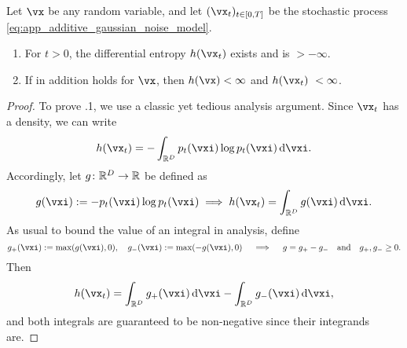 \documentclass[../../book-main.tex]{subfiles}
\begin{document}
\begin{lemma}\label{lem:diffusion_entropy_exists}
    Let \(\vx\) be any random variable, and let \((\vx_{t})_{t \in [0, T]}\) be the stochastic process \eqref{eq:app_additive_gaussian_noise_model}. 
    \begin{enumerate}
        \item For \(t > 0\), the differential entropy \(h(\vx_{t})\) exists and is \(> -\infty\).
        \item If in addition  holds for \(\vx\), then \(h(\vx) < \infty\) and \(h(\vx_{t})\ < \infty\).
    \end{enumerate}
\end{lemma}
\begin{proof}
    To prove .1, we use a classic yet tedious analysis argument. Since \(\vx_{t}\) has a density, we can write 
    \begin{equation}
        h(\vx_{t}) = -\int_{\R^{D}}p_{t}(\vxi)\log p_{t}(\vxi) \odif{\vxi}.
    \end{equation}
    Accordingly, let \(g \colon \mathbb{R}^{D} \to \mathbb{R}\) be defined as 
    \begin{equation}
        g(\vxi) := -p_{t}(\vxi)\log p_{t}(\vxi) \implies h(\vx_{t}) = \int_{\R^{D}}g(\vxi)\odif{\vxi}.
    \end{equation}
    As usual to bound the value of an integral in analysis, define 
    \begin{equation}
        g_{+}(\vxi) := \max(g(\vxi), 0), \quad g_{-}(\vxi) := \max(-g(\vxi), 0) \quad \implies \quad g = g_{+} - g_{-}\quad \text{and} \quad g_{+}, g_{-} \geq 0.
    \end{equation}
    Then 
    \begin{equation}
        h(\vx_{t}) = \int_{\R^{D}}g_{+}(\vxi)\odif{\vxi} - \int_{\R^{D}}g_{-}(\vxi)\odif{\vxi},
    \end{equation}
    and both integrals are guaranteed to be non-negative since their integrands are. 
    

\end{proof}
\end{document}
